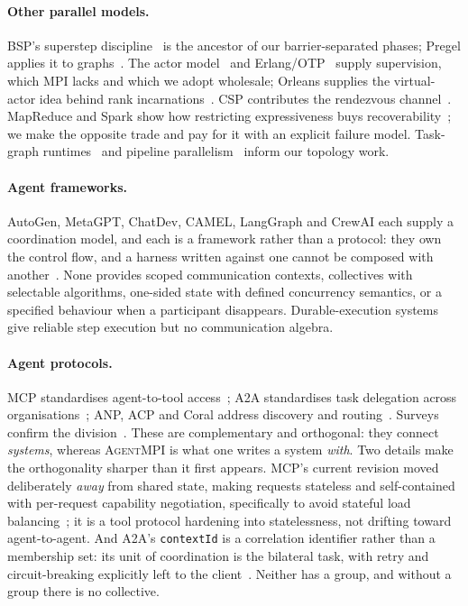 \documentclass[10pt,twocolumn]{article}
\theoremstyle{definition}
\theoremstyle{plain}
\newcommand{\ampi}{\textsc{AgentMPI}}
\newcommand{\code}[1]{\texttt{\small #1}}
\begin{document}
\paragraph{Other parallel models.} BSP's superstep discipline~\cite{valiant90bsp} is
the ancestor of our barrier-separated phases; Pregel applies it to
graphs~\cite{malewicz10pregel}. The actor
model~\cite{hewitt73actor,agha86actors} and Erlang/OTP~\cite{armstrong03erlang}
supply supervision, which MPI lacks and which we adopt wholesale; Orleans supplies
the virtual-actor idea behind rank incarnations~\cite{bernstein14orleans}. CSP
contributes the rendezvous channel~\cite{hoare78csp}.
MapReduce and Spark show how restricting expressiveness buys
recoverability~\cite{dean04mapreduce,zaharia12rdd}; we make the opposite trade and
pay for it with an explicit failure model. Task-graph
runtimes~\cite{bauer12legion,moritz18ray} and pipeline
parallelism~\cite{huang19gpipe} inform our topology work.

\paragraph{Agent frameworks.} AutoGen, MetaGPT, ChatDev, CAMEL, LangGraph and CrewAI
each supply a coordination model, and each is a framework rather than a
protocol: they own the control flow, and a harness written against one cannot be
composed with
another~\cite{wu24autogen,hong24metagpt,qian24chatdev,li23camel,langgraph,crewai}.
None provides scoped communication contexts, collectives with selectable algorithms,
one-sided state with defined concurrency semantics, or a specified behaviour when a
participant disappears. Durable-execution systems~\cite{temporal} give reliable
step execution but no communication algebra.

\paragraph{Agent protocols.} MCP standardises agent-to-tool
access~\cite{mcpspec2026}; A2A standardises task delegation across
organisations~\cite{a2adefs}; ANP, ACP and Coral address discovery and
routing~\cite{anpwp,coral}. Surveys confirm the
division~\cite{yangsurvey,ehteshamsurvey}. These are complementary and orthogonal:
they connect \emph{systems}, whereas \ampi{} is what one writes a system
\emph{with}. Two details make the orthogonality sharper than it first appears. MCP's
current revision moved deliberately \emph{away} from shared state, making requests
stateless and self-contained with per-request capability negotiation, specifically to
avoid stateful load balancing~\cite{mcpspec2026,mcpsep2322}; it is a tool protocol
hardening into statelessness, not drifting toward agent-to-agent. And A2A's
\code{contextId} is a correlation identifier rather than a membership set: its unit
of coordination is the bilateral task, with retry and circuit-breaking explicitly
left to the client~\cite{a2adefs,a2alifeoftask}. Neither has a group, and without a
group there is no collective.
\end{document}
